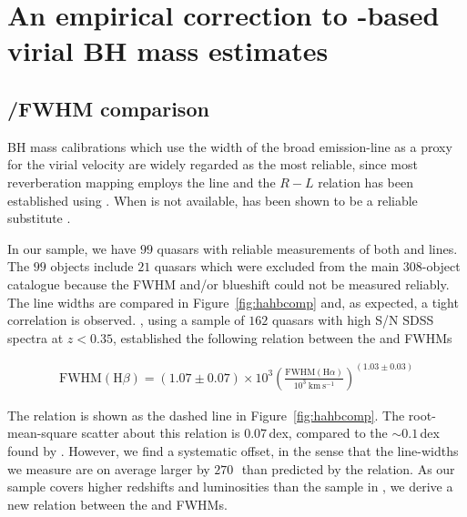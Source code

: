 \section{An empirical correction to -based virial BH mass estimates}

\subsection{\hans/\hb FWHM comparison}
\label{sec:hahbcomparison}

BH mass calibrations which use the width of the broad \hb emission-line as a proxy for the virial velocity are widely regarded as the most reliable, since most reverberation mapping employs the \hb line and the $R-L$ relation has been established using \hbns.
When \hb is not available, \ha has been shown to be a reliable substitute \citep[e.g.][]{greene05b,shen11,shen12}. 

In our sample, we have $99$ quasars with reliable measurements of both \ha and \hb lines. 
The $99$ objects include $21$ quasars which were excluded from the main $308$-object catalogue because the  FWHM and/or blueshift could not be measured reliably. 
The line widths are compared in Figure~\ref{fig:hahbcomp} and, as expected, a tight correlation is observed.  
\citet{greene05b}, using a sample of $162$ quasars with high S/N SDSS spectra at $z < 0.35$, established the following relation between the \ha and \hb FWHMs

\begin{eqnarray}
  \mathrm{FWHM}(\mathrm{H}\beta) = \left( 1.07 \pm 0.07 \right) \times 10^3 \left( \frac{ \mathrm{FWHM}(\mathrm{H}\alpha) }{10^3 ~\mathrm{km}~\mathrm{s}^{-1} } \right)^{(1.03 \pm 0.03)}
\end{eqnarray}

The relation is shown as the dashed line in Figure~\ref{fig:hahbcomp}.
The root-mean-square scatter about this relation is $0.07$\,dex, compared to the $\sim0.1$\,dex found by \citet{greene05b}. 
However, we find a systematic offset, in the sense that the \hb line-widths we measure are on average larger by $270$\,\kms\, than predicted by the \citet{greene05b} relation. 
As our sample covers higher redshifts and luminosities than the sample in \citet{greene05b}, we derive a new relation between the \ha and \hb FWHMs.       

